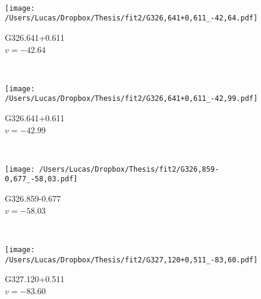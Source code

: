 \begin{figure*}[t]
\begin{subfigure}[t]{0.3\textwidth}
	\end{subfigure}
	~
	\begin{subfigure}[t]{0.3\textwidth}
		\texttt{[image: /Users/Lucas/Dropbox/Thesis/fit2/G326,641+0,611\_-42,64.pdf]}
		\caption[]{G326.641+0.611\\$v=-42.64$\,\kms}
	\end{subfigure}
	~
	\begin{subfigure}[t]{0.3\textwidth}
		\texttt{[image: /Users/Lucas/Dropbox/Thesis/fit2/G326,641+0,611\_-42,99.pdf]}
		\caption[]{G326.641+0.611\\$v=-42.99$\,\kms}
	\end{subfigure}
	~
	\begin{subfigure}[t]{0.3\textwidth}
		\texttt{[image: /Users/Lucas/Dropbox/Thesis/fit2/G326,859-0,677\_-58,03.pdf]}
		\caption[]{G326.859-0.677\\$v=-58.03$\,\kms}
	\end{subfigure}
	~
	\begin{subfigure}[t]{0.3\textwidth}
		\texttt{[image: /Users/Lucas/Dropbox/Thesis/fit2/G327,120+0,511\_-83,60.pdf]}
		\caption[]{G327.120+0.511\\$v=-83.60$\,\kms}
	\end{subfigure}
	~
\end{figure*}
\clearpage
